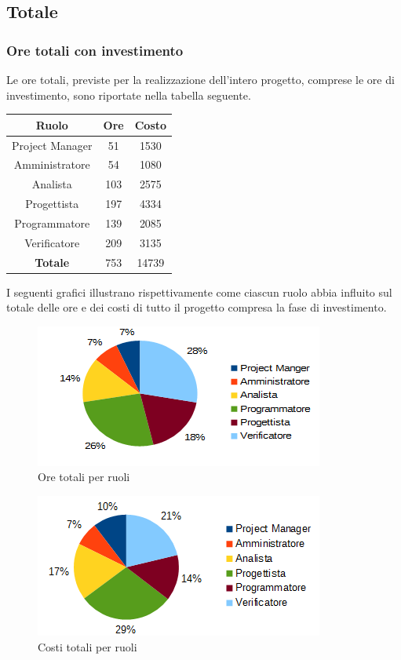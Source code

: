 	\subsection{Totale}
		\subsubsection{Ore totali con investimento}
		Le ore totali, previste per la realizzazione dell'intero progetto, comprese le ore di investimento, sono riportate nella tabella seguente. \\
		\begin{table}[H]
		\centering
		\begin{tabular}{|c|c|c|}
			\hline
			\textbf{Ruolo}		& \textbf{Ore}	& \textbf{Costo} \\
			\hline
			Project Manager		& 51			& 1530	\\
			Amministratore		& 54			& 1080	\\
			Analista			& 103			& 2575	\\
			Progettista			& 197			& 4334	\\
			Programmatore		& 139			& 2085	\\
			Verificatore		& 209			& 3135	\\
			\hline
			\textbf{Totale}		& 753			& 14739	\\
			\hline
		\end{tabular}
		\end{table}
		I seguenti grafici illustrano rispettivamente come ciascun ruolo abbia influito sul totale delle ore e dei costi di tutto il progetto compresa la fase di investimento. \\
		\begin{figure}[H]
		\centering
			\includegraphics[scale=1]{immagini/grafici/riepilogo_conclusivo-torta.png}
			\caption{Ore totali per ruoli}
		\end{figure}
		\begin{figure}[H]
			\centering
			\includegraphics[scale=1]{immagini/grafici/riepilogo_conclusivo-torta-costo.png}
			\caption{Costi totali per ruoli}
		\end{figure}

